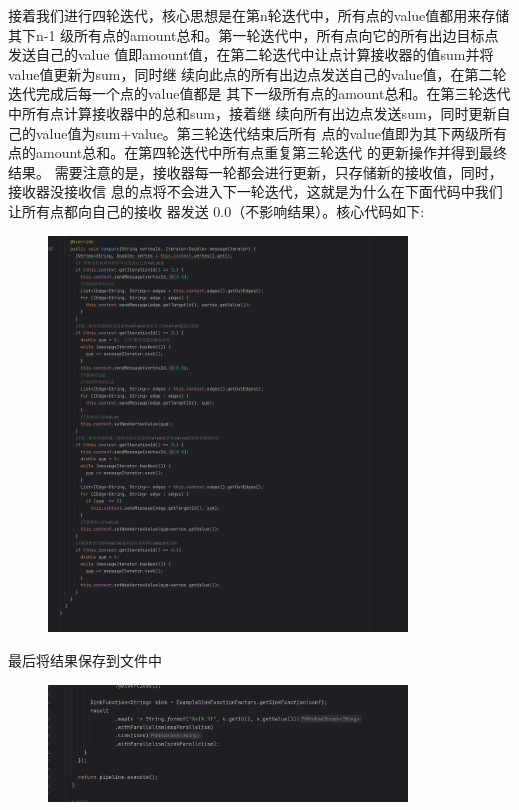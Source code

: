 接着我们进行四轮迭代，核心思想是在第n轮迭代中，所有点的value值都用来存储其下n-1
级所有点的amount总和。第一轮迭代中，所有点向它的所有出边目标点发送自己的value
值即amount值，在第二轮迭代中让点计算接收器的值sum并将value值更新为sum，同时继
续向此点的所有出边点发送自己的value值，在第二轮迭代完成后每一个点的value值都是
其下一级所有点的amount总和。在第三轮迭代中所有点计算接收器中的总和sum，接着继
续向所有出边点发送sum，同时更新自己的value值为sum+value。第三轮迭代结束后所有
点的value值即为其下两级所有点的amount总和。在第四轮迭代中所有点重复第三轮迭代
的更新操作并得到最终结果。
需要注意的是，接收器每一轮都会进行更新，只存储新的接收值，同时，接收器没接收信
息的点将不会进入下一轮迭代，这就是为什么在下面代码中我们让所有点都向自己的接收
器发送 $ 0.0 $（不影响结果）。核心代码如下:
\begin{figure}[H]
  \begin{center}
    \includegraphics[width=0.85\textwidth,scale=0.7]{./figures/pro3/5.png}
  \end{center}
\end{figure}

最后将结果保存到文件中
\begin{figure}[H]
  \begin{center}
    \includegraphics[width=0.85\textwidth,scale=0.7]{./figures/pro3/6.png}
  \end{center}
\end{figure}

